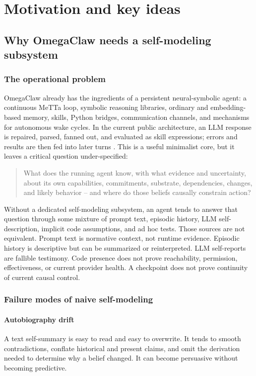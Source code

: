 \documentclass[11pt,oneside]{report}
\begin{document}
\part{Motivation and key ideas}

\chapter{Why OmegaClaw needs a self-modeling subsystem}

\section{The operational problem}

OmegaClaw already has the ingredients of a persistent neural-symbolic agent: a continuous MeTTa loop, symbolic reasoning libraries, ordinary and embedding-based memory, skills, Python bridges, communication channels, and mechanisms for autonomous wake cycles. In the current public architecture, an LLM response is repaired, parsed, fanned out, and evaluated as skill expressions; errors and results are then fed into later turns \cite{omegaclaw-loop,omegaclaw-dispatch}. This is a useful minimalist core, but it leaves a critical question under-specified:

\begin{quote}
What does the running agent know, with what evidence and uncertainty, about its own capabilities, commitments, substrate, dependencies, changes, and likely behavior -- and where do those beliefs causally constrain action?
\end{quote}

Without a dedicated self-modeling subsystem, an agent tends to answer that question through some mixture of prompt text, episodic history, LLM self-description, implicit code assumptions, and ad hoc tests. Those sources are not equivalent. Prompt text is normative context, not runtime evidence. Episodic history is descriptive but can be summarized or reinterpreted. LLM self-reports are fallible testimony. Code presence does not prove reachability, permission, effectiveness, or current provider health. A checkpoint does not prove continuity of current causal control.

\section{Failure modes of naive self-modeling}

\subsection{Autobiography drift}
A text self-summary is easy to read and easy to overwrite. It tends to smooth contradictions, conflate historical and present claims, and omit the derivation needed to determine why a belief changed. It can become persuasive without becoming predictive.
\end{document}

